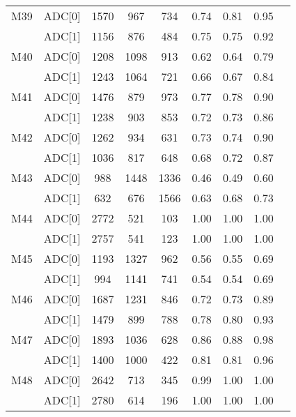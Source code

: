\begin{longtable}{c c c c c c c c c}
  M39 & ADC[0] & 1570 & 967 & 734 & 0.74 & 0.81 & 0.95\\
     & ADC[1] & 1156 & 876 & 484 & 0.75 & 0.75 & 0.92\\
  M40 & ADC[0] & 1208 & 1098 & 913 & 0.62 & 0.64 & 0.79\\
     & ADC[1] & 1243 & 1064 & 721 & 0.66 & 0.67 & 0.84\\
  M41 & ADC[0] & 1476 & 879 & 973 & 0.77 & 0.78 & 0.90\\
     & ADC[1] & 1238 & 903 & 853 & 0.72 & 0.73 & 0.86\\
  M42 & ADC[0] & 1262 & 934 & 631 & 0.73 & 0.74 & 0.90\\
     & ADC[1] & 1036 & 817 & 648 & 0.68 & 0.72 & 0.87\\
  M43 & ADC[0] & 988 & 1448 & 1336 & 0.46 & 0.49 & 0.60\\
     & ADC[1] & 632 & 676 & 1566 & 0.63 & 0.68 & 0.73\\
  M44 & ADC[0] & 2772 & 521 & 103 & 1.00 & 1.00 & 1.00\\
     & ADC[1] & 2757 & 541 & 123 & 1.00 & 1.00 & 1.00\\
  M45 & ADC[0] & 1193 & 1327 & 962 & 0.56 & 0.55 & 0.69\\
     & ADC[1] & 994 & 1141 & 741 & 0.54 & 0.54 & 0.69\\
  M46 & ADC[0] & 1687 & 1231 & 846 & 0.72 & 0.73 & 0.89\\
     & ADC[1] & 1479 & 899 & 788 & 0.78 & 0.80 & 0.93\\
  M47 & ADC[0] & 1893 & 1036 & 628 & 0.86 & 0.88 & 0.98\\
     & ADC[1] & 1400 & 1000 & 422 & 0.81 & 0.81 & 0.96\\
  M48 & ADC[0] & 2642 & 713 & 345 & 0.99 & 1.00 & 1.00\\
     & ADC[1] & 2780 & 614 & 196 & 1.00 & 1.00 & 1.00\\
  \bottomrule
\end{longtable}

\normalsize
